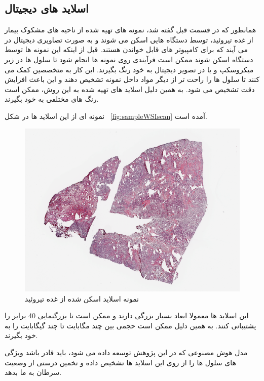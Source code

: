 \subsection{اسلاید های دیجیتال}\label{subsec:اسلاید-های-دیجیتال}
همانطور که در قسمت قبل گفته شد، نمونه های تهیه شده از ناحیه های مشکوک بیمار از غده تیروئید، توسط دستگاه هایی اسکن می شوند و به صورت تصاویری دیجیتال در می آیند که برای کامپیوتر های قابل خواندن هستند.
قبل از اینکه این نمونه ها توسط دستگاه اسکن شوند ممکن است فرآیندی روی نمونه ها انجام شود تا سلول ها در زیر میکروسکپ و یا در تصویر دیجیتال به خود رنگ بگیرند.
این کار به متخصصین کمک می کنند تا سلول ها را راحت تر از دیگر مواد داخل نمونه تشخیص دهند و این باعث افزایش دقت تشخیص می شود.
به همین دلیل اسلاید های تهیه شده به این روش، ممکن است رنگ های مختلفی به خود بگیرند.


نمونه ای از این اسلاید ها در شکل ~\autoref{fig:sampleWSIscan} آمده است.
\begin{figure}
    \begin{center}
        \includegraphics[width=\linewidth]{figs/introduction/Sample_WSI.PNG}
    \end{center}
    \caption{نمونه اسلاید اسکن شده از غده تیروئید}
    \label{fig:sampleWSIscan}
\end{figure}
این اسلاید ها معمولا ابعاد بسیار بزرگی دارند و ممکن است تا بزرگنمایی 40 برابر را پشتیبانی کنند.
به همین دلیل ممکن است حجمی بین چند مگابایت تا چند گیگابایت را به خود بگیرند.

مدل هوش مصنوعی که در این پژوهش توسعه داده می شود، باید قادر باشد ویژگی های سلول ها را از روی این اسلاید ها تشخیص داده و تخمین درستی از وضعیت سرطان به ما بدهد.